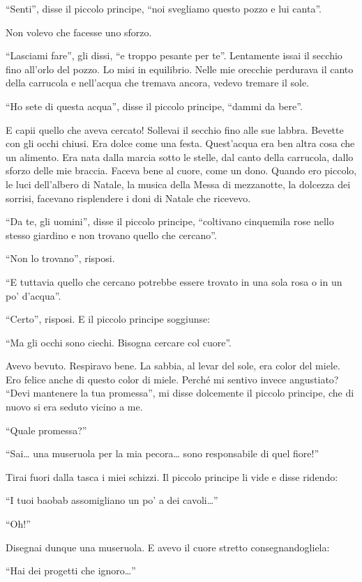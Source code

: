 \documentclass[11pt]{scrbook}
\begin{document}
``Senti'', disse il piccolo principe, ``noi svegliamo questo pozzo e lui canta''.

Non volevo che facesse uno sforzo.

``Lasciami fare'', gli dissi, ``e troppo pesante per te''. Lentamente issai il secchio fino all'orlo del pozzo. Lo misi in equilibrio. Nelle mie orecchie perdurava il canto della carrucola e nell'acqua che tremava ancora, vedevo tremare il sole.

``Ho sete di questa acqua'', disse il piccolo principe, ``dammi da bere''.

E capii quello che aveva cercato! Sollevai il secchio fino alle sue labbra. Bevette con gli occhi chiusi. Era dolce come una festa. Quest'acqua era ben altra cosa che un alimento. Era nata dalla marcia sotto le stelle, dal canto della carrucola, dallo sforzo delle mie braccia. Faceva bene al cuore, come un dono. Quando ero piccolo, le luci dell'albero di Natale, la musica della Messa di mezzanotte, la dolcezza dei sorrisi, facevano risplendere i doni di Natale che ricevevo.

``Da te, gli uomini'', disse il piccolo principe, ``coltivano cinquemila rose nello stesso giardino e non trovano quello che cercano''.

``Non lo trovano'', risposi.

``E tuttavia quello che cercano potrebbe essere trovato in una sola rosa o in un po' d'acqua''.

``Certo'', risposi. E il piccolo principe soggiunse:

``Ma gli occhi sono ciechi. Bisogna cercare col cuore''.

Avevo bevuto. Respiravo bene. La sabbia, al levar del sole, era color del miele. Ero felice anche di questo color di miele. Perché mi sentivo invece angustiato? ``Devi mantenere la tua promessa'', mi disse dolcemente il piccolo principe, che di nuovo si era seduto vicino a me.

``Quale promessa?''

``Sai\ldots{} una museruola per la mia pecora\ldots{} sono responsabile di quel fiore!''

Tirai fuori dalla tasca i miei schizzi. Il piccolo principe li vide e disse ridendo:

``I tuoi baobab assomigliano un po' a dei cavoli\ldots{}''

``Oh!''

Disegnai dunque una museruola. E avevo il cuore stretto consegnandogliela:

``Hai dei progetti che ignoro\ldots{}''
\end{document}
